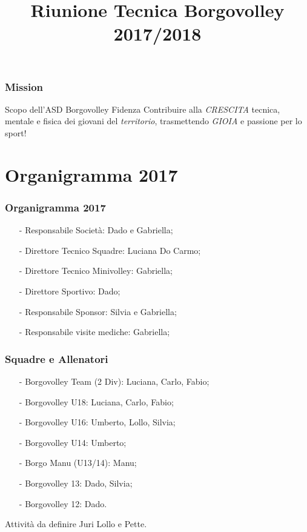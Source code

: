 \documentclass{beamer}
\title[Borgovolley 2017/2018]{Riunione Tecnica Borgovolley 2017/2018}
\date[24 Agosto 2017]{}
\begin{document}
\begin{frame}
\maketitle
\end{frame}

\begin{frame}
\frametitle{Mission}
\begin{block}{Scopo dell'ASD Borgovolley Fidenza}
Contribuire alla \emph{CRESCITA} tecnica, mentale e fisica dei giovani del \emph{territorio}, trasmettendo \emph{GIOIA} e passione per lo sport!
\end{block}
\end{frame}

\section{Organigramma 2017}
\begin{frame}
\frametitle{Organigramma 2017}
\begin{itemize}
\item[-]Responsabile Società: Dado e Gabriella;
\item[-]Direttore Tecnico Squadre: Luciana Do Carmo;
\item[-]Direttore Tecnico Minivolley: Gabriella;
\item[-]Direttore Sportivo: Dado;
\item[-]Responsabile Sponsor: Silvia e Gabriella;
\item[-]Responsabile visite mediche: Gabriella;
\end{itemize}
\end{frame}

\begin{frame}
\frametitle{Squadre e Allenatori}
\begin{itemize}
\item[-]Borgovolley Team (2 Div): Luciana, Carlo, Fabio;
\item[-]Borgovolley U18: Luciana, Carlo, Fabio;
\item[-]Borgovolley U16: Umberto, Lollo, Silvia;
\item[-]Borgovolley U14: Umberto;
\item[-]Borgo Manu (U13/14): Manu;
\item[-]Borgovolley 13: Dado, Silvia;
\item[-]Borgovolley 12: Dado.
\end{itemize}

\begin{block}{Attività da definire}
Juri Lollo e Pette.
\end{block}
\end{frame}
\end{document}
